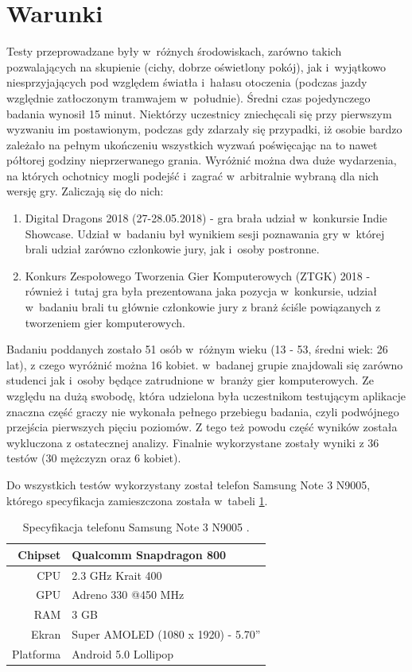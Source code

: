 \documentclass[a4paper,12pt,numbers=noenddot]{report}
\begin{document}
\section{Warunki}
Testy przeprowadzane były w~różnych środowiskach, zarówno takich pozwalających na skupienie (cichy, dobrze oświetlony pokój), jak i~wyjątkowo niesprzyjających pod względem światła i~hałasu otoczenia (podczas jazdy względnie zatłoczonym tramwajem w~południe). Średni czas pojedynczego badania wynosił 15 minut. Niektórzy uczestnicy zniechęcali się przy pierwszym wyzwaniu im postawionym, podczas gdy zdarzały się przypadki, iż osobie bardzo zależało na pełnym ukończeniu wszystkich wyzwań poświęcając na to nawet półtorej godziny nieprzerwanego grania. Wyróżnić można dwa duże wydarzenia, na których ochotnicy mogli podejść i~zagrać w~arbitralnie wybraną dla nich wersję gry. Zaliczają się do nich:
\begin{enumerate}
\item Digital Dragons 2018 (27-28.05.2018) - gra brała udział w~konkursie Indie Showcase. Udział w~badaniu był wynikiem sesji poznawania gry w~której brali udział zarówno członkowie jury, jak i~osoby postronne.
\item Konkurs Zespołowego Tworzenia Gier Komputerowych (ZTGK) 2018 - również i~tutaj gra była prezentowana jaka pozycja w~konkursie, udział w~badaniu brali tu głównie członkowie jury z branż ściśle powiązanych z tworzeniem gier komputerowych.
\end{enumerate}
Badaniu poddanych zostało 51 osób w~różnym wieku (13 - 53, średni wiek: 26 lat), z czego wyróżnić można 16 kobiet. w~badanej grupie znajdowali się zarówno studenci jak i~osoby będące zatrudnione w~branży gier komputerowych. Ze względu na dużą swobodę, która udzielona była uczestnikom testującym aplikacje znaczna część graczy nie wykonała pełnego przebiegu badania, czyli podwójnego przejścia pierwszych pięciu poziomów. Z tego też powodu część wyników została wykluczona z ostatecznej analizy. Finalnie wykorzystane zostały wyniki z 36 testów (30 mężczyzn oraz 6 kobiet).

Do wszystkich testów wykorzystany został telefon Samsung Note 3 N9005, którego specyfikacja zamieszczona została w~tabeli \ref{tab:tab_telSpec}.

\begin{table}[H]
  \centering
  \caption{Specyfikacja telefonu Samsung Note 3 N9005 \cite{online_Note3Spec}.}
  \label{tab:tab_telSpec}
  \begin{tabular}{|r|l|}
    \hline
    Chipset & Qualcomm Snapdragon 800 \\
    \hline
    CPU & 2.3 GHz Krait 400\\
    \hline
    GPU & Adreno 330 @450 MHz\\
    \hline
    RAM & 3 GB\\
    \hline
    Ekran & Super AMOLED (1080 x 1920) - 5.70''\\
    \hline
    Platforma & Android 5.0 Lollipop\\
    \hline
  \end{tabular}
\end{table}
\end{document}

